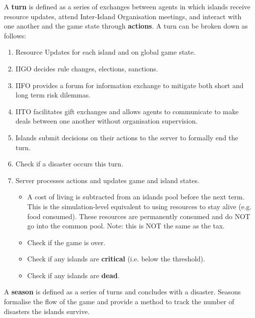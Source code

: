 \begin{definition} \label{def:turn}
    A \textbf{turn} is defined as a series of exchanges between agents in which islands receive resource updates, attend Inter-Island Organisation meetings, and interact with one another and the game state through \textbf{actions}. A turn can be broken down as follows:
    \begin{enumerate}
        \item Resource Updates for each island and on global game state.
        \item IIGO decides rule changes, elections, sanctions.
        \item IIFO provides a forum for information exchange to mitigate both short and long term risk dilemmas.
        \item IITO facilitates gift exchanges and allows agents to communicate to make deals between one another without organisation supervision.
        \item Islands submit decisions on their actions to the server to formally end the turn.
        \item Check if a disaster occurs this turn.
        \item Server processes actions and updates game and island states.
            \begin{itemize}
                \item A cost of living is subtracted from an islands pool before the next term. This is the simulation-level equivalent to using resources to stay alive (e.g. food consumed). These resources are permanently consumed and do NOT go into the common pool. Note: this is NOT the same as the tax.
                \item Check if the game is over.
                \item Check if any islands are \textbf{critical} (i.e. below the threshold).
                \item Check if any islands are \textbf{dead}.
            \end{itemize}
    \end{enumerate}        
\end{definition}

\begin{definition} \label{def:gameseason}
    A \textbf{season} is defined as a series of turns and concludes with a disaster. Seasons formalise the flow of the game and provide a method to track the number of disasters the islands survive.
\end{definition}

